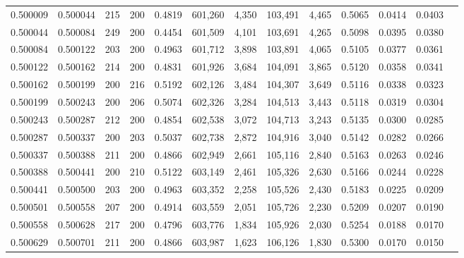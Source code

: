\begin{tabular}{rrrrrrrrrrrrr}
0.500009 & 0.500044 &   215 & 200 &                                     0.4819 & 601,260 &   4,350 & 103,491 &   4,465 & 0.5065 & 0.0414 & 0.0403 \\
0.500044 & 0.500084 &   249 & 200 &                                     0.4454 & 601,509 &   4,101 & 103,691 &   4,265 & 0.5098 & 0.0395 & 0.0380 \\
0.500084 & 0.500122 &   203 & 200 &                                     0.4963 & 601,712 &   3,898 & 103,891 &   4,065 & 0.5105 & 0.0377 & 0.0361 \\
0.500122 & 0.500162 &   214 & 200 &                                     0.4831 & 601,926 &   3,684 & 104,091 &   3,865 & 0.5120 & 0.0358 & 0.0341 \\
0.500162 & 0.500199 &   200 & 216 &                                     0.5192 & 602,126 &   3,484 & 104,307 &   3,649 & 0.5116 & 0.0338 & 0.0323 \\
0.500199 & 0.500243 &   200 & 206 &                                     0.5074 & 602,326 &   3,284 & 104,513 &   3,443 & 0.5118 & 0.0319 & 0.0304 \\
0.500243 & 0.500287 &   212 & 200 &                                     0.4854 & 602,538 &   3,072 & 104,713 &   3,243 & 0.5135 & 0.0300 & 0.0285 \\
0.500287 & 0.500337 &   200 & 203 &                                     0.5037 & 602,738 &   2,872 & 104,916 &   3,040 & 0.5142 & 0.0282 & 0.0266 \\
0.500337 & 0.500388 &   211 & 200 &                                     0.4866 & 602,949 &   2,661 & 105,116 &   2,840 & 0.5163 & 0.0263 & 0.0246 \\
0.500388 & 0.500441 &   200 & 210 &                                     0.5122 & 603,149 &   2,461 & 105,326 &   2,630 & 0.5166 & 0.0244 & 0.0228 \\
0.500441 & 0.500500 &   203 & 200 &                                     0.4963 & 603,352 &   2,258 & 105,526 &   2,430 & 0.5183 & 0.0225 & 0.0209 \\
0.500501 & 0.500558 &   207 & 200 &                                     0.4914 & 603,559 &   2,051 & 105,726 &   2,230 & 0.5209 & 0.0207 & 0.0190 \\
0.500558 & 0.500628 &   217 & 200 &                                     0.4796 & 603,776 &   1,834 & 105,926 &   2,030 & 0.5254 & 0.0188 & 0.0170 \\
0.500629 & 0.500701 &   211 & 200 &                                     0.4866 & 603,987 &   1,623 & 106,126 &   1,830 & 0.5300 & 0.0170 & 0.0150 \\

\end{tabular}
